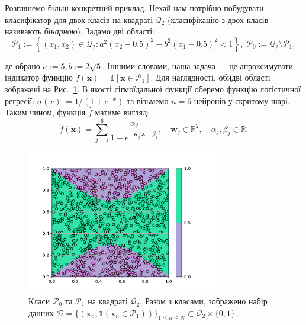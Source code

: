 \begin{example}
	Розглянемо більш конкретний приклад. Нехай нам потрібно побудувати 
	класифікатор для двох класів на квадраті $\mathcal{Q}_2$ (класифікацію з двох 
	класів називають \textit{бінарною}). Задамо дві області:
	\begin{equation*}
		\mathcal{P}_1 := \left\{(x_1,x_2) \in \mathcal{Q}_2: a^2\left(x_2-0.5\right)^2 - b^2\left(x_1-0.5\right)^2 < 1\right\}, \; \mathcal{P}_0 := \mathcal{Q}_2 \setminus \mathcal{P}_1,
	\end{equation*}

	де обрано $a:=5,b:=2\sqrt{5}$. Іншими словами, наша задача --- це апроксимувати індикатор функцію
	$f(\mathbf{x}) = \mathds{1}[\mathbf{x} \in \mathcal{P}_1]$. Для наглядності,
	обидві області зображені на Рис.~\ref{fig:classification_example}. В якості
	сігмоїдальної функції оберемо функцію логістичної регресії: $\sigma(x) :=
	1/(1+e^{-x})$ та візьмемо $n=6$ нейронів у скритому шарі. Таким чином,
	функція $\widehat{f}$ матиме вигляд:
	\begin{equation*}
		\widehat{f}(\mathbf{x}) = \sum_{j=1}^6 \frac{\alpha_j}{1+e^{-\boldsymbol{w}_j^{\top}\mathbf{x} + \beta_j}}, \quad \boldsymbol{w}_j \in \mathbb{R}^2, \quad \alpha_j,\beta_j \in \mathbb{R}.
	\end{equation*}

	\begin{figure}
		\centering
		\includegraphics[width=0.75\textwidth]{code/cybenko/classification-example.pdf}
		\caption{Класи $\mathcal{P}_0$ та $\mathcal{P}_1$ на квадраті
		$\mathcal{Q}_2$. Разом з класами, зображено набір данних
		$\mathcal{D}=\{(\mathbf{x}_n,\mathds{1}(\mathbf{x}_n \in
		\mathcal{P}_1))\}_{1 \leq n \leq N} \subset \mathcal{Q}_2 \times
		\{0,1\}$.}
		\label{fig:classification_example}
	\end{figure}


\end{example}
